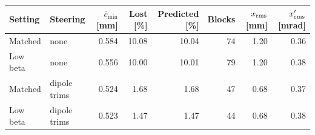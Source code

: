 \begin{tabular}{llrrrrrr}\toprule
Setting & Steering & $\bar c_{\min}$ [mm] & Lost [\%] & Predicted [\%] & Blocks & $x_{\rm rms}$ [mm] & $x'_{\rm rms}$ [mrad] \\\midrule
Matched & none & 0.584 & 10.08 & 10.04 & 74 & 1.20 & 0.36 \\
Low beta & none & 0.556 & 10.00 & 10.01 & 79 & 1.20 & 0.38 \\
Matched & dipole trims & 0.524 & 1.68 & 1.68 & 47 & 0.68 & 0.37 \\
Low beta & dipole trims & 0.523 & 1.47 & 1.47 & 44 & 0.68 & 0.38 \\
\bottomrule\end{tabular}
